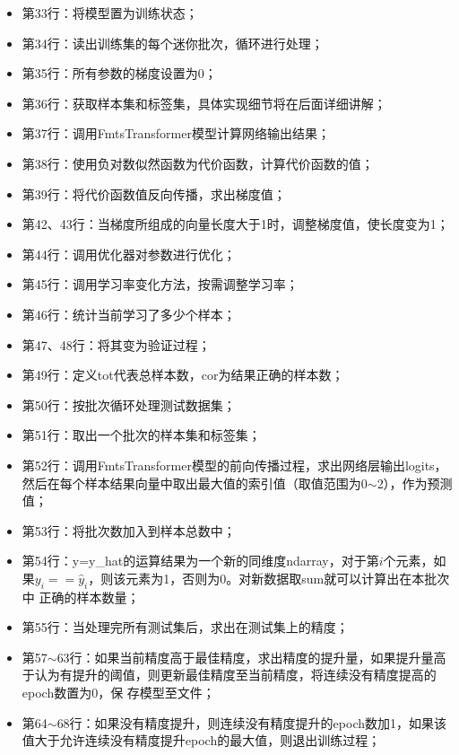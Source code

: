 \begin{itemize}
    \item 第33行：将模型置为训练状态；
    \item 第34行：读出训练集的每个迷你批次，循环进行处理；
    \item 第35行：所有参数的梯度设置为0；
    \item 第36行：获取样本集和标签集，具体实现细节将在后面详细讲解；
    \item 第37行：调用FmtsTransformer模型计算网络输出结果；
    \item 第38行：使用负对数似然函数为代价函数，计算代价函数的值；
    \item 第39行：将代价函数值反向传播，求出梯度值；
    \item 第42、43行：当梯度所组成的向量长度大于1时，调整梯度值，使长度变为1；
    \item 第44行：调用优化器对参数进行优化；
    \item 第45行：调用学习率变化方法，按需调整学习率；
    \item 第46行：统计当前学习了多少个样本；
    \item 第47、48行：将其变为验证过程；
    \item 第49行：定义tot代表总样本数，cor为结果正确的样本数；
    \item 第50行：按批次循环处理测试数据集；
    \item 第51行：取出一个批次的样本集和标签集；
    \item 第52行：调用FmtsTransformer模型的前向传播过程，求出网络层输出logits，然后在每个样本结果向量中取出最大值的索引值（取值范围为0$\sim$2），作为预测值；
    \item 第53行：将批次数加入到样本总数中；
    \item 第54行：y=y\_hat的运算结果为一个新的同维度ndarray，对于第$i$个元素，如果$y_{i}==\hat{y}_{i}$，则该元素为1，否则为0。对新数据取sum就可以计算出在本批次中
    正确的样本数量；
    \item 第55行：当处理完所有测试集后，求出在测试集上的精度；
    \item 第57$\sim$63行：如果当前精度高于最佳精度，求出精度的提升量，如果提升量高于认为有提升的阈值，则更新最佳精度至当前精度，将连续没有精度提高的epoch数置为0，保
    存模型至文件；
    \item 第64$\sim$68行：如果没有精度提升，则连续没有精度提升的epoch数加1，如果该值大于允许连续没有精度提升epoch的最大值，则退出训练过程；
\end{itemize}

